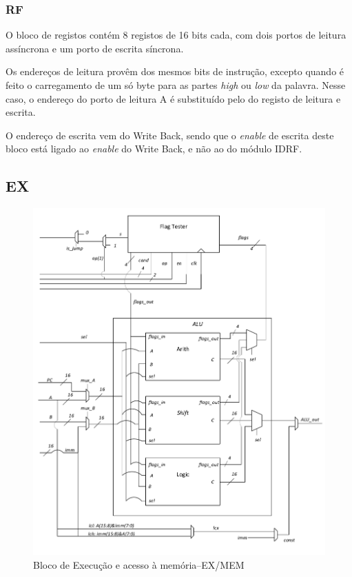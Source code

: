 \documentclass[a4paper]{article}
\begin{document}
			\subsubsection{RF}
				
				O bloco de registos contém 8 registos de 16 bits cada, com dois portos de leitura assíncrona e um porto de escrita síncrona.
				
				Os endereços de leitura provêm dos mesmos bits de instrução, excepto quando é feito o carregamento de um só byte para as partes \textit{high} ou \textit{low} da palavra. Nesse caso, o endereço do porto de leitura A é substituído pelo do registo de leitura e escrita.
				
				O endereço de escrita vem do Write Back, sendo que o \textit{enable} de escrita deste bloco está ligado ao \textit{enable} do Write Back, e não ao do módulo IDRF.
			
		\subsection{EX}
		
			\begin{figure}[H]
				\centering
				\centerline{
					\includegraphics[width=.8\paperwidth]{img/EX}
				}
				\caption{Bloco de Execução e acesso à memória--EX/MEM}
				\label{fig:ex}
			\end{figure}
		
\end{document}
